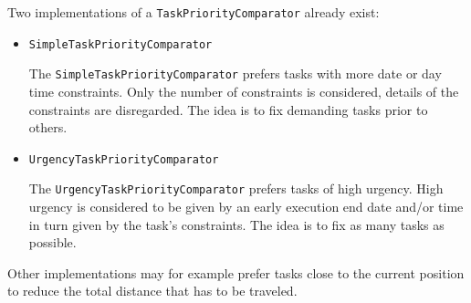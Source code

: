 Two implementations of a \texttt{TaskPriorityComparator} already exist:

\begin{itemize}

	\item \texttt{SimpleTaskPriorityComparator}
	
		The \texttt{SimpleTaskPriorityComparator} prefers tasks with more date or day time constraints. Only the number of constraints is considered, details of the constraints are disregarded. The idea is to fix demanding tasks prior to others.
	
	\item \texttt{UrgencyTaskPriorityComparator}
	
		The \texttt{UrgencyTaskPriorityComparator} prefers tasks of high urgency. High urgency is considered to be given by an early execution end date and/or time in turn given by the task's constraints. The idea is to fix as many tasks as possible.
	
\end{itemize}

Other implementations may for example prefer tasks close to the current position to reduce the total distance that has to be traveled.